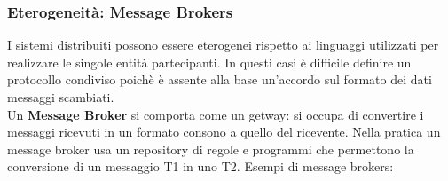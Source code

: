 \documentclass[12pt]{article}
\begin{document}
		\subsubsection{Eterogeneità: Message Brokers}
			I sistemi distribuiti possono essere eterogenei rispetto ai linguaggi utilizzati per realizzare le singole entità partecipanti. In questi casi è difficile definire un protocollo condiviso poichè è assente alla base un'accordo sul formato dei dati messaggi scambiati.\\
			Un \textbf{Message Broker} si comporta come un getway: si occupa di convertire i messaggi ricevuti in un formato consono a quello del ricevente. Nella pratica un message broker usa un repository di regole e programmi che permettono la conversione di un messaggio T1 in uno T2.
			Esempi di message brokers: 
			
\end{document}
